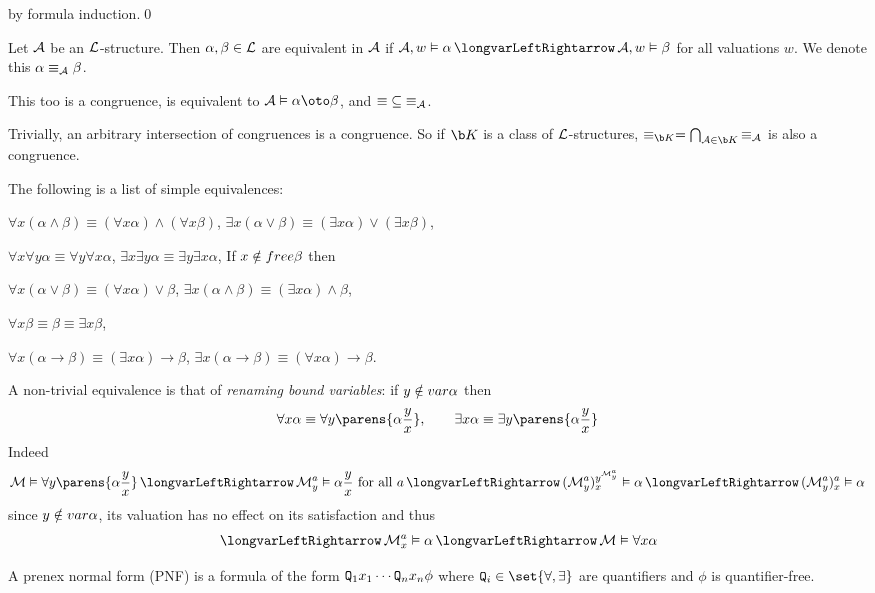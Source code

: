 \Proof by formula induction.\qed

\bdefn

    Let ${\cal A}$ be an ${\cal L}$-structure.
    Then $\alpha,\beta\in{\cal L}$ are {\emphcolor equivalent in ${\cal A}$} if $\c A,w\vDash\alpha\iff\c A,w\vDash\beta$ for all valuations $w$.
    We denote this $\alpha\equiv_{{\cal A}}\beta$.

\edefn

This too is a congruence, is equivalent to $\c A\vDash\alpha\oto\beta$, and ${\equiv}\subseteq{\equiv}_{{\cal A}}$.

Trivially, an arbitrary intersection of congruences is a congruence.
So if $\b K$ is a class of ${\cal L}$-structures, $\equiv_{\b K}=\bigcap_{\c A\in\b K}{\equiv}_{\c A}$ is also a congruence.

The following is a list of simple equivalences:
\benum
    \item $\forall x(\alpha\land\beta)\equiv(\forall x\alpha)\land(\forall x\beta)$, $\exists x(\alpha\lor\beta)\equiv(\exists x\alpha)\lor(\exists x\beta)$,
    \item $\forall x\forall y\alpha\equiv\forall y\forall x\alpha$, $\exists x\exists y\alpha\equiv\exists y\exists x\alpha$,
    \mtext If $x\notin{\sl free}\beta$ then
    \item $\forall x(\alpha\lor\beta)\equiv(\forall x\alpha)\lor\beta$, $\exists x(\alpha\land\beta)\equiv(\exists x\alpha)\land\beta$,
    \item $\forall x\beta\equiv\beta\equiv\exists x\beta$,
    \item $\forall x(\alpha\to\beta)\equiv(\exists x\alpha)\to\beta$, $\exists x(\alpha\to\beta)\equiv(\forall x\alpha)\to\beta$.
\eenum

A non-trivial equivalence is that of {\it renaming bound variables}: if $y\notin{\sl var}\alpha$ then
$$ \forall x\alpha \equiv \forall y\parens{\alpha\frac yx},\qquad \exists x\alpha\equiv\exists y\parens{\alpha\frac yx} $$
Indeed
$$ \c M\vDash\forall y\parens{\alpha\frac yx} \iff \c M^a_y\vDash\alpha\frac yx\hbox{ for all $a$} \iff (\c M^a_y)^{y^{\c M^a_y}}_x\vDash\alpha \iff (\c M^a_y)^a_x\vDash\alpha $$
since $y\notin{\sl var}\alpha$, its valuation has no effect on its satisfaction and thus
$$ \iff \c M^a_x\vDash\alpha \iff \c M\vDash\forall x\alpha $$

\bdefn

    A {\emphcolor prenex normal form} (PNF) is a formula of the form ${\tt Q}_1x_1\cdots{\tt Q}_nx_n\phi$ where $\Q_i\in\set{{\forall},{\exists}}$ are quantifiers and $\phi$ is quantifier-free.

